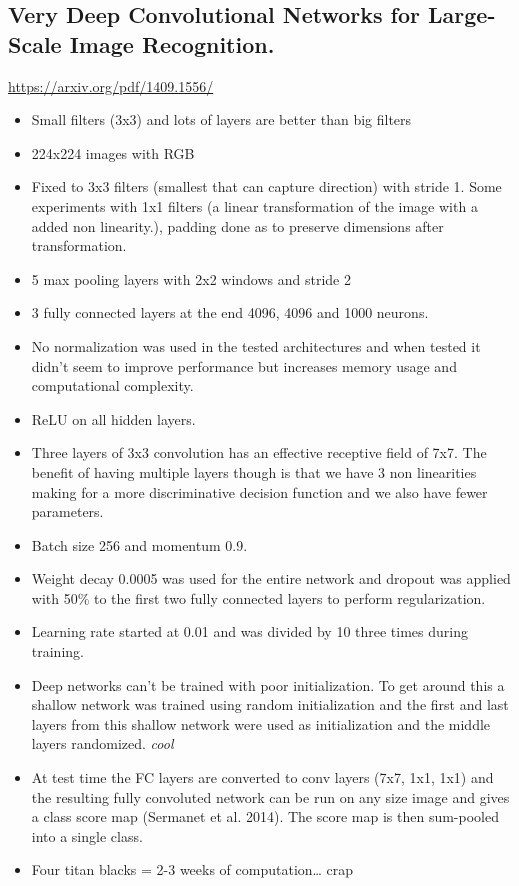 \documentclass[11pt]{article}
\begin{document}
\subsection{Very Deep Convolutional Networks for Large-Scale Image Recognition.}
\label{sec:org876282a}
\url{https://arxiv.org/pdf/1409.1556/}
\begin{itemize}
\item Small filters (3x3) and lots of layers are better than big filters
\item 224x224 images with RGB
\item Fixed to 3x3 filters (smallest that can capture direction) with stride 1. Some experiments with 1x1 filters (a linear transformation of the image with a added non linearity.), padding done as to preserve dimensions after transformation.
\item 5 max pooling layers with 2x2 windows and stride 2
\item 3 fully connected layers at the end 4096, 4096 and 1000 neurons.
\item No normalization was used in the tested architectures and when tested it didn't seem to improve performance but increases memory usage and computational complexity.
\item ReLU on all hidden layers.
\item Three layers of 3x3 convolution has an effective receptive field of 7x7. The benefit of having multiple layers though is that we have 3 non linearities making for a more discriminative decision function and we also have fewer parameters.
\item Batch size 256 and momentum 0.9.
\item Weight decay 0.0005 was used for the entire network and dropout was applied with 50\% to the first two fully connected layers to perform regularization.
\item Learning rate started at 0.01 and was divided by 10 three times during training.
\item Deep networks can't be trained with poor initialization. To get around this a shallow network was trained using random initialization and the first and last layers from this shallow network were used as initialization and the middle layers randomized. \emph{cool}
\item At test time the FC layers are converted to conv layers (7x7, 1x1, 1x1) and the resulting fully convoluted network can be run on any size image and gives a class score map (Sermanet et al. 2014). The score map is then sum-pooled into a single class.
\item Four titan blacks = 2-3 weeks of computation\ldots{} crap
\end{itemize}
\end{document}
